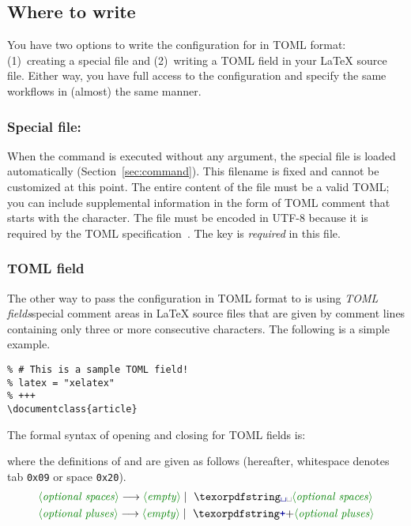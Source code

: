 \documentclass[draft]{llmk-doc}
\begin{document}
\subsection{Where to write}
\label{sec:toml-where}

You have two options to write the configuration for  in TOML format:
(1)~creating a special file  and (2)~writing a TOML field in
your {\LaTeX} source file. Either way, you have full access to the 
configuration and specify the same workflows in (almost) the same manner.

\subsubsection*{Special file: }

When the  command is executed without any argument, the special file
 is loaded automatically (Section~\ref{sec:command}). This
filename is fixed and cannot be customized at this point. The entire content of
the file must be a valid TOML; you can include supplemental information in the
form of TOML comment that starts with the \code{\#} character. The file must
be encoded in UTF-8 because it is required by the TOML
specification~\cite{toml}. The  key is \emph{required} in this
file.

\subsubsection*{TOML field}

The other way to pass the configuration in TOML format to  is using
\emph{TOML fields}\Dash special comment areas in {\LaTeX} source files that are
given by comment lines containing only three or more consecutive \code{+}
characters. The following is a simple example.
%
\begin{lstlisting}[style=latex]
% +++
% # This is a sample TOML field!
% latex = "xelatex"
% +++
\documentclass{article}
\end{lstlisting}

The formal syntax of opening and closing for TOML fields is:
%
\begin{htcode}
\end{htcode}
%
where the definitions of  and  are
given as follows (hereafter, whitespace \code{\textvisiblespace} denotes tab
\texttt{0x09} or space \texttt{0x20}).
%
\begin{align*}
&\text{\meta{optional spaces}}
  \longrightarrow \text{\meta{empty}}
  \mid\text{\code{\textvisiblespace}\meta{optional spaces}} \\
&\text{\meta{optional pluses}}
  \longrightarrow \text{\meta{empty}}
  \mid\text{\code{+}\meta{optional pluses}}
\end{align*}
\end{document}
